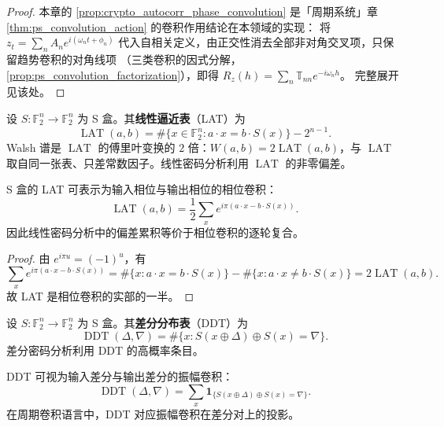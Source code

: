\begin{proof}
本章的 \cref{prop:crypto_autocorr_phase_convolution} 是「周期系统」章 \cref{thm:ps_convolution_action} 的卷积作用结论在本领域的实现：
将 $z_t=\sum_n A_n e^{i(\omega_n t+\phi_n)}$ 代入自相关定义，由正交性消去全部非对角交叉项，只保留趋势卷积的对角线项
（三类卷积的因式分解，\cref{prop:ps_convolution_factorization}），即得 $R_z(h)=\sum_n\mathbb T_{nn}e^{-i\omega_n h}$。
完整展开见该处。
\end{proof}

\begin{definition}\label{def:walsh_lat}
设 \(S:\mathbb F_2^n\to\mathbb F_2^n\) 为 S 盒。其\textbf{线性逼近表}（LAT）为
\[
\operatorname{LAT}(a,b)=\#\{x\in\mathbb F_2^n:a\cdot x=b\cdot S(x)\}-2^{n-1}.
\]
Walsh 谱是 \(\operatorname{LAT}\) 的傅里叶变换的 $2$ 倍：$W(a,b)=2\operatorname{LAT}(a,b)$，与 \(\operatorname{LAT}\) 取自同一张表、只差常数因子。线性密码分析利用 \(\operatorname{LAT}\) 的非零偏差。
\end{definition}

\begin{proposition}\label{prop:lat_phase_convolution}
S 盒的 LAT 可表示为输入相位与输出相位的相位卷积：
\[
\operatorname{LAT}(a,b)=\frac12\sum_x e^{i\pi(a\cdot x-b\cdot S(x))}.
\]
因此线性密码分析中的偏差累积等价于相位卷积的逐轮复合。
\end{proposition}

\begin{proof}
由 \(e^{i\pi u}=(-1)^u\)，有
\[
\sum_x e^{i\pi(a\cdot x-b\cdot S(x))}
=\#\{x:a\cdot x=b\cdot S(x)\}-\#\{x:a\cdot x\neq b\cdot S(x)\}
=2\operatorname{LAT}(a,b).
\]
故 LAT 是相位卷积的实部的一半。
\end{proof}

\begin{definition}[差分分布表]\label{def:ddt}
设 \(S:\mathbb F_2^n\to\mathbb F_2^n\) 为 S 盒。其\textbf{差分分布表}（DDT）为
\[
\operatorname{DDT}(\Delta,\nabla)=\#\{x:S(x\oplus\Delta)\oplus S(x)=\nabla\}.
\]
差分密码分析利用 DDT 的高概率条目。
\end{definition}

\begin{proposition}\label{prop:ddt_amplitude_convolution}
DDT 可视为输入差分与输出差分的振幅卷积：
\[
\operatorname{DDT}(\Delta,\nabla)=\sum_x \mathbf 1_{\{S(x\oplus\Delta)\oplus S(x)=\nabla\}}.
\]
在周期卷积语言中，DDT 对应振幅卷积在差分对上的投影。
\end{proposition}

